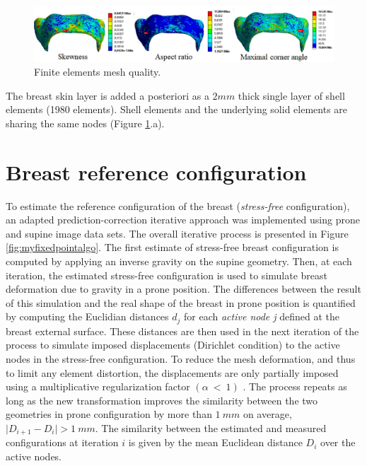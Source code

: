 \begin{figure}[!h]
\centering
\includegraphics[width=1\textwidth,keepaspectratio]{figures/meshquality.jpg} 
\caption{ Finite elements mesh quality.}\label{fig:meshquality}
\end{figure}




The breast skin layer is added a posteriori   as a $2mm$ thick single layer of shell elements (1980 elements). Shell elements and the underlying solid elements are sharing the same nodes (Figure \ref{fig:meshquality}.a).



\section{Breast reference configuration}\label{section:myStressFree}
To estimate the reference configuration of the breast (\textit{stress-free} configuration), an adapted prediction-correction iterative approach was implemented \citep{eiben_breast_2014} using prone and supine image data sets. The overall iterative process is presented in Figure \ref{fig:myfixedpointalgo}. The first estimate of stress-free breast configuration is computed by applying an inverse gravity on the supine geometry. Then, at each iteration, the estimated stress-free configuration is used to simulate breast deformation due to gravity in a prone position. The differences between the result of this simulation and the real shape of the breast in prone position is quantified by computing the Euclidian distances $d_j$ for each \textit{active node j} defined at the breast external surface. These distances are then used in the next iteration of the process to simulate imposed displacements (Dirichlet condition) to the active nodes in the stress-free configuration. To reduce the mesh deformation, and thus to limit any element distortion, the displacements are only partially imposed using a multiplicative regularization factor $ (\alpha\ <\ 1)$ . The process repeats as long as the new transformation improves the similarity between the two geometries in prone configuration by more than $1\ mm$ on average, $\vert D_{i+1}-D_i \vert > 1\ mm$. The similarity between the estimated and measured configurations at iteration $i$ is given by the mean Euclidean distance $D_i$ over the active nodes.                                                              

